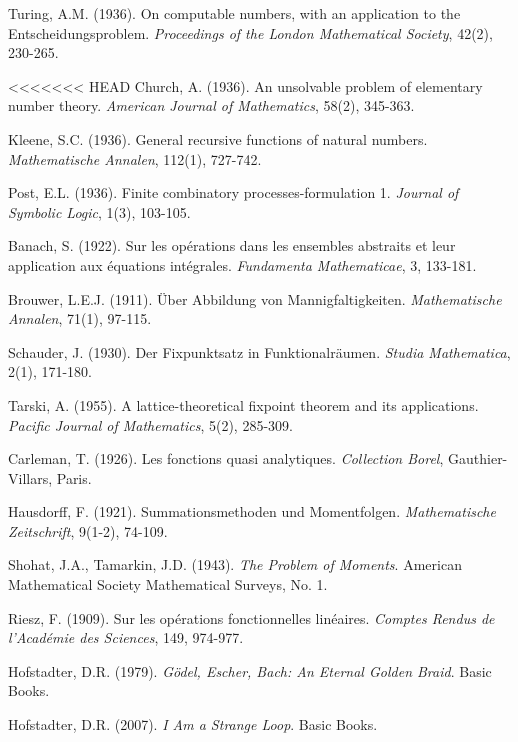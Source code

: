 \documentclass[12pt]{article}
\theoremstyle{plain}
\theoremstyle{definition}
\begin{document}
\begin{thebibliography}{99}
 Turing, A.M. (1936). On computable numbers, with an application to the Entscheidungsproblem. \emph{Proceedings of the London Mathematical Society}, 42(2), 230-265.

<<<<<<< HEAD
 Church, A. (1936). An unsolvable problem of elementary number theory. \emph{American Journal of Mathematics}, 58(2), 345-363.

 Kleene, S.C. (1936). General recursive functions of natural numbers. \emph{Mathematische Annalen}, 112(1), 727-742.

 Post, E.L. (1936). Finite combinatory processes-formulation 1. \emph{Journal of Symbolic Logic}, 1(3), 103-105.

 Banach, S. (1922). Sur les opérations dans les ensembles abstraits et leur application aux équations intégrales. \emph{Fundamenta Mathematicae}, 3, 133-181.

 Brouwer, L.E.J. (1911). Über Abbildung von Mannigfaltigkeiten. \emph{Mathematische Annalen}, 71(1), 97-115.

 Schauder, J. (1930). Der Fixpunktsatz in Funktionalräumen. \emph{Studia Mathematica}, 2(1), 171-180.

 Tarski, A. (1955). A lattice-theoretical fixpoint theorem and its applications. \emph{Pacific Journal of Mathematics}, 5(2), 285-309.

 Carleman, T. (1926). Les fonctions quasi analytiques. \emph{Collection Borel}, Gauthier-Villars, Paris.

 Hausdorff, F. (1921). Summationsmethoden und Momentfolgen. \emph{Mathematische Zeitschrift}, 9(1-2), 74-109.

 Shohat, J.A., Tamarkin, J.D. (1943). \emph{The Problem of Moments}. American Mathematical Society Mathematical Surveys, No. 1.

 Riesz, F. (1909). Sur les opérations fonctionnelles linéaires. \emph{Comptes Rendus de l'Académie des Sciences}, 149, 974-977.

 Hofstadter, D.R. (1979). \emph{Gödel, Escher, Bach: An Eternal Golden Braid}. Basic Books.

 Hofstadter, D.R. (2007). \emph{I Am a Strange Loop}. Basic Books.


\end{thebibliography}
\end{document}
